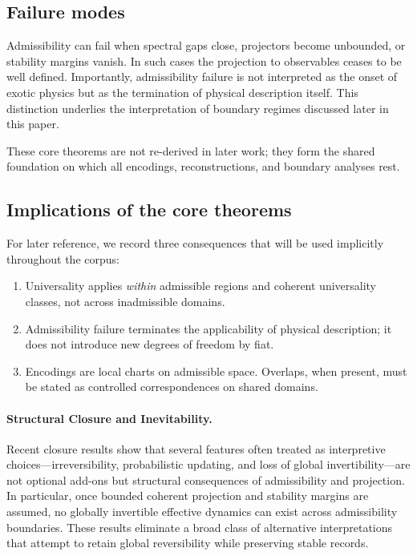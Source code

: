 \documentclass[11pt]{article}
\begin{document}
\subsection{Failure modes}

Admissibility can fail when spectral gaps close, projectors become unbounded, or stability margins vanish. In such cases the projection to observables ceases to be well defined. Importantly, admissibility failure is not interpreted as the onset of exotic physics but as the termination of physical description itself. This distinction underlies the interpretation of boundary regimes discussed later in this paper.

These core theorems are not re-derived in later work; they form the shared foundation on which all encodings, reconstructions, and boundary analyses rest.

\subsection*{Implications of the core theorems}
For later reference, we record three consequences that will be used implicitly throughout the corpus:
\begin{enumerate}[label=\textbf{(I\arabic*)}]
\item Universality applies \emph{within} admissible regions and coherent universality classes, not across inadmissible domains.
\item Admissibility failure terminates the applicability of physical description; it does not introduce new degrees of freedom by fiat.
\item Encodings are local charts on admissible space. Overlaps, when present, must be stated as controlled correspondences on shared domains.
\end{enumerate}

\paragraph{Structural Closure and Inevitability.}
Recent closure results show that several features often treated as interpretive
choices---irreversibility, probabilistic updating, and loss of global invertibility---are
not optional add-ons but structural consequences of admissibility and projection.
In particular, once bounded coherent projection and stability margins are assumed,
no globally invertible effective dynamics can exist across admissibility boundaries.
These results eliminate a broad class of alternative interpretations that attempt to
retain global reversibility while preserving stable records.
\end{document}
